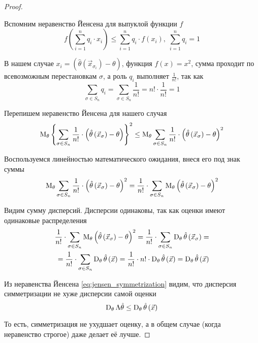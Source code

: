 \begin{proof}
\begin{enumerate}
      Вспомним неравенство Йенсена для выпуклой функции $f$
      \cite[с.~167]{DorogovtsevMA}
      $$f\left(\sum_{i=1}^n q_i\cdot x_i\right)
          \le \sum_{i=1}^n q_i\cdot f\left(x_i\right),\;
        \sum_{i=1}^n q_i=1$$

      В нашем случае
      $x_i=\left(\hat{\theta}
          \left(\vec{x}_{\sigma_i}\right)-\theta\right)$,
      функция $f\left(x\right)=x^2$,
      сумма проходит по всевозможным перестановкам $\sigma$,
      а роль $q_i$ выполняет $\frac{1}{n!}$,
      так как
          $$\sum_{\sigma\in S_n} q_i
        =\sum_{\sigma\in S_n}\frac{1}{n!}=n!\cdot\frac{1}{n!}=1$$

      Перепишем неравенство Йенсена для нашего случая
      \begin{equation}\label{eq:jensen_symmetrization}
          \operatorname{M}_{\theta} \left\{\sum_{\sigma\in S_n}\frac{1}{n!}\cdot
        \left(\hat{\theta}\left(\vec{x}_\sigma\right)
        -\theta\right)\right\}^2
        \le\operatorname{M}_{\theta} \sum_{\sigma\in S_n}\frac{1}{n!}\cdot
            \left(\hat{\theta}\left(\vec{x}_\sigma\right)
            -\theta\right)^2
      \end{equation}

      Воспользуемся линейностью математического ожидания,
      внеся его под знак суммы
      \begin{align*}
          \operatorname{M}_{\theta} \sum_{\sigma\in S_n}\frac{1}{n!}\cdot
        \left(\hat{\theta}\left(\vec{x}_\sigma\right)
        -\theta\right)^2
          =\frac{1}{n!}\cdot\sum_{\sigma\in S_n}
        \operatorname{M}_{\theta} 
            \left(\hat{\theta}\left(\vec{x}_\sigma\right)
            -\theta\right)^2
      \end{align*}

      Видим сумму дисперсий.
      Дисперсии одинаковы, так как оценки имеют одинаковые распределения
      \begin{align*}
          \frac{1}{n!}\cdot\sum_{\sigma\in S_n}
        \operatorname{M}_{\theta} 
            \left(\hat{\theta}\left(\vec{x}_\sigma\right)
            -\theta\right)^2
          =\frac{1}{n!}\cdot\sum_{\sigma\in S_n}
        \operatorname{D}_{\theta} 
            \hat{\theta}\left(\vec{x}_\sigma\right)=\\
          =\frac{1}{n!}\cdot\sum_{\sigma\in S_n}
        \operatorname{D}_{\theta} \hat{\theta}\left(\vec{x}\right)
          =\frac{1}{n!}\cdot n!
        \cdot\operatorname{D}_{\theta} \hat{\theta}\left(\vec{x}\right)
          =\operatorname{D}_{\theta} \hat{\theta}\left(\vec{x}\right)
      \end{align*}

      Из неравенства Йенсена \eqref{eq:jensen_symmetrization} видим,
      что дисперсия симметризации не хуже дисперсии самой оценки
      $$\operatorname{D}_{\theta} \Lambda\hat{\theta}
          \le\operatorname{D}_{\theta} \hat{\theta}\left({\vec{x}}\right)$$

  \end{enumerate}

  То есть, симметризация не ухудшает оценку,
  а в общем случае (когда неравенство строгое) даже делает её лучше.
\end{proof}

